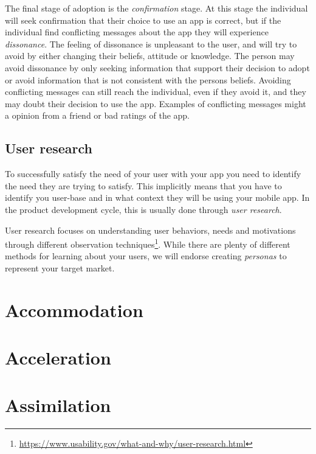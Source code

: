 The final stage of adoption is the \textit{confirmation} stage. At this stage the individual will seek confirmation that their choice to use an app is correct, but if the individual find conflicting messages about the app they will experience \textit{dissonance}. The feeling of dissonance is unpleasant to the user, and will try to avoid by either changing their beliefs, attitude or knowledge. The person may avoid dissonance by only seeking information that support their decision to adopt or avoid information that is not consistent with the persons beliefs. Avoiding conflicting messages can still reach the individual, even if they avoid it, and they may doubt their decision to use the app. Examples of conflicting messages might a opinion from a friend or bad ratings of the app.

\subsection{User research}
To successfully satisfy the need of your user with your app you need to identify the need they are trying to satisfy. This implicitly means that you have to identify you user-base and in what context they will be using your mobile app. In the product development cycle, this is usually done through \textit{user research}.

User research focuses on understanding user behaviors, needs and motivations through different observation techniques\footnote{\url{https://www.usability.gov/what-and-why/user-research.html}}. While there are plenty of different methods for learning about your users, we will endorse creating \textit{personas} to represent your target market.

\section{Accommodation}

\section{Acceleration}

\section{Assimilation}
